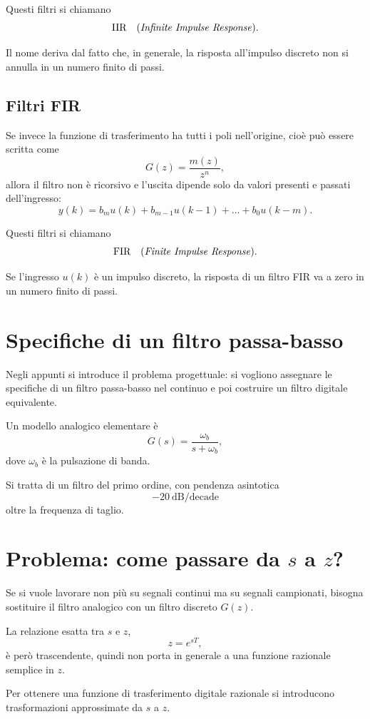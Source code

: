 Questi filtri si chiamano
\[
\text{IIR} \quad \text{(\emph{Infinite Impulse Response})}.
\]

Il nome deriva dal fatto che, in generale, la risposta all'impulso discreto
non si annulla in un numero finito di passi.

\subsection{Filtri FIR}

Se invece la funzione di trasferimento ha tutti i poli nell'origine, cio\`e pu\`o essere scritta come
\[
G(z)=\frac{m(z)}{z^n},
\]
allora il filtro non \`e ricorsivo e l'uscita dipende solo da valori presenti e passati dell'ingresso:
\[
y(k)=b_m u(k)+b_{m-1}u(k-1)+\dots+b_0 u(k-m).
\]

Questi filtri si chiamano
\[
\text{FIR} \quad \text{(\emph{Finite Impulse Response})}.
\]

Se l'ingresso \(u(k)\) \`e un impulso discreto, la risposta di un filtro FIR va a zero
in un numero finito di passi.

\section{Specifiche di un filtro passa-basso}

Negli appunti si introduce il problema progettuale:
si vogliono assegnare le specifiche di un filtro passa-basso nel continuo
e poi costruire un filtro digitale equivalente.

Un modello analogico elementare \`e
\[
G(s)=\frac{\omega_b}{s+\omega_b},
\]
dove \(\omega_b\) \`e la pulsazione di banda.

Si tratta di un filtro del primo ordine, con pendenza asintotica
\[
-20\ \text{dB/decade}
\]
oltre la frequenza di taglio.

\section{Problema: come passare da \(s\) a \(z\)?}

Se si vuole lavorare non pi\`u su segnali continui ma su segnali campionati,
bisogna sostituire il filtro analogico con un filtro discreto \(G(z)\).

La relazione esatta tra \(s\) e \(z\),
\[
z=e^{sT},
\]
\`e per\`o trascendente, quindi non porta in generale a una funzione razionale semplice in \(z\).

Per ottenere una funzione di trasferimento digitale razionale
si introducono trasformazioni approssimate da \(s\) a \(z\).

